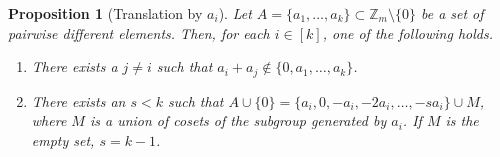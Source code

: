 \documentclass[11pt]{amsart}
\newtheorem{proposition}[theorem]{Proposition}
\theoremstyle{definition}
\begin{document}
\begin{proposition}[Translation by $a_i$]\label{prop:another_2}
	Let $A=\{a_1,\ldots,a_k\}\subset \mathbb{Z}_m\setminus \{0\}$ be a set of pairwise different elements. Then, for each $i\in [k]$, one of the following holds.
	\begin{enumerate}
		\item\label{enum:1} There exists a $j\neq i$ such that $a_i+a_j\notin \{0,a_1,\ldots,a_k\}$.
        \item \label{enum:4} There exists an $s<k$ such that $A\cup \{0\}=\{a_i,0,-a_i,-2a_i,\ldots,-sa_i\}\cup M$, where $M$ is a union of cosets of the subgroup generated by $a_i$. If $M$ is the empty set, $s=k-1$.
		\end{enumerate}
\end{proposition}
\end{document}
